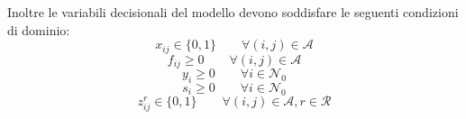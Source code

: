 		Inoltre le variabili decisionali del modello devono soddisfare le seguenti condizioni di dominio:
		\begin{equation}
			\label{eq:assignment_var}
			x_{ij} \in \{0,1\} \qquad \forall (i,j) \in \mathcal{A}
		\end{equation}
		\begin{equation}
			\label{eq:assignment_var}
			f_{ij} \geq 0 \qquad \forall (i,j) \in \mathcal{A}
		\end{equation}
		\begin{equation}
			\label{eq:assignment_var}
			y_i \geq 0 \qquad \forall i \in \mathcal{N}_0
		\end{equation}
		\begin{equation}
			\label{eq:assignment_var}
			s_i \geq 0 \qquad \forall i \in \mathcal{N}_0
		\end{equation}
		\begin{equation}
			\label{eq:assignment_var}
			z_{ij}^r \in \{0,1\} \qquad \forall (i,j) \in \mathcal{A}, r \in \mathcal{R}
		\end{equation}


